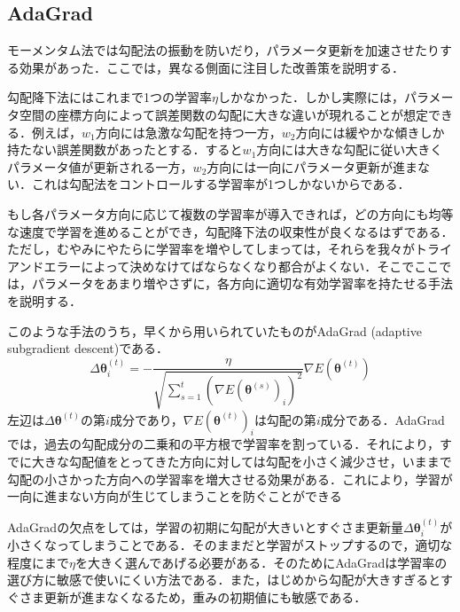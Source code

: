 \documentclass[a4paper,11pt]{jsreport}
\begin{document}
\subsection{AdaGrad}
モーメンタム法では勾配法の振動を防いだり，パラメータ更新を加速させたりする効果があった．ここでは，異なる側面に注目した改善策を説明する．\par
勾配降下法にはこれまで1つの学習率$\eta$しかなかった．しかし実際には，パラメータ空間の座標方向によって誤差関数の勾配に大きな違いが現れることが想定できる．例えば，$w_1$方向には急激な勾配を持つ一方，$w_2$方向には緩やかな傾きしか持たない誤差関数があったとする．すると$w_1$方向には大きな勾配に従い大きくパラメータ値が更新される一方，$w_2$方向には一向にパラメータ更新が進まない．これは勾配法をコントロールする学習率が1つしかないからである．\par
もし各パラメータ方向に応じて複数の学習率が導入できれば，どの方向にも均等な速度で学習を進めることができ，勾配降下法の収束性が良くなるはずである．ただし，むやみにやたらに学習率を増やしてしまっては，それらを我々がトライアンドエラーによって決めなけてばならなくなり都合がよくない．そこでここでは，パラメータをあまり増やさずに，各方向に適切な有効学習率を持たせる手法を説明する．\par
このような手法のうち，早くから用いられていたものがAdaGrad (adaptive subgradient descent)である．
\begin{equation}
  \Delta \bm{\theta}_i^{(t)}
  = -\frac{\eta}{\sqrt{\sum_{s=1}^{t}\left(\nabla E(\bm{\theta}^{(s)})_i\right)^2}} \nabla E(\bm{\theta}^{(t)})
\end{equation}
左辺は$\Delta \bm{\theta}^{(t)}$の第$i$成分であり，$\nabla E(\bm{\theta}^{(t)})_i$は勾配の第$i$成分である．AdaGradでは，過去の勾配成分の二乗和の平方根で学習率を割っている．それにより，すでに大きな勾配値をとってきた方向に対しては勾配を小さく減少させ，いままで勾配の小さかった方向への学習率を増大させる効果がある．これにより，学習が一向に進まない方向が生じてしまうことを防ぐことができる\par
AdaGradの欠点をしては，学習の初期に勾配が大きいとすぐさま更新量$\Delta \bm{\theta}_i^{(t)}$が小さくなってしまうことである．そのままだと学習がストップするので，適切な程度にまで$\eta$を大きく選んであげる必要がある．そのためにAdaGradは学習率の選び方に敏感で使いにくい方法である．また，はじめから勾配が大きすぎるとすぐさま更新が進まなくなるため，重みの初期値にも敏感である．
\end{document}
